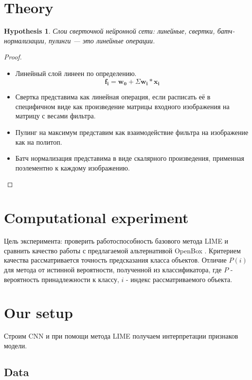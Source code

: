 \documentclass[12pt]{article}
\begin{document}
\section{Theory}

\newtheorem{hypothesis}{Hypothesis}
\begin{hypothesis}
Слои сверточной нейронной сети: линейные, свертки, батч-нормализации, пулинги --- это линейные операции.
\end{hypothesis}

\begin{proof}
\begin{itemize}
    \item Линейный слой линеен по определению. 
    $$\mathbf{f_i} = \mathbf{w_0} + \Sigma \mathbf{w_i} * \mathbf{x_i}$$
    \item Свертка представима как линейная операция, если расписать её в специфичном виде как произведение матрицы входного изображения на матрицу с весами фильтра.
    \item Пулинг на максимум представим как взаимодействие фильтра на изображение как на политоп.
    \item Батч нормализация представима в виде скалярного произведения, применная поэлементно к каждому изображению.
\end{itemize}
\end{proof}

\section{Computational experiment}

Цель эксперимента: проверить работоспособность базового метода LIME \cite{ribeiro2016why} и сравнить качество работы с предлагаемой альтернативой OpenBox \cite{chu2019exact}. Критерием качества рассматривается точность предсказания класса объектов. Отличие $P(i)$ для метода от истинной вероятности, полученной из классификатора, где $P$ - вероятность принадлежности к классу, $i$ - индекс рассматриваемого объекта.

\section{Our setup}


Строим CNN и при помощи метода LIME \cite{ribeiro2016why} получаем интерпретации признаков модели.

\subsection{Data}
\end{document}

